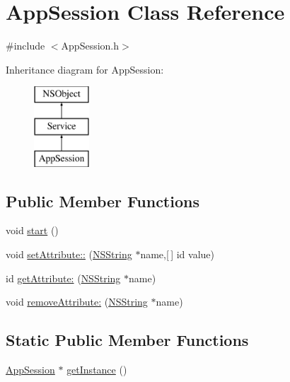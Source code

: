 \hypertarget{interface_app_session}{
\section{\-App\-Session \-Class \-Reference}
\label{interface_app_session}
}


{\ttfamily \#include $<$\-App\-Session.\-h$>$}

\-Inheritance diagram for \-App\-Session\-:\begin{figure}[H]
\begin{center}
\leavevmode
\includegraphics[height=3.000000cm]{interface_app_session}
\end{center}
\end{figure}
\subsection*{\-Public \-Member \-Functions}
\begin{DoxyCompactItemize}
\item 
void \hyperlink{interface_app_session_a7cde5b1e47a0688accbe132e4cb47fa3}{start} ()
\item 
void \hyperlink{interface_app_session_a271fac98c8d374b2b16eb9aa2e377471}{set\-Attribute\-::} (\hyperlink{class_n_s_string}{\-N\-S\-String} $\ast$name,\mbox{[}$\,$\mbox{]} id value)
\item 
id \hyperlink{interface_app_session_af93b42969f1490778007171cc125a160}{get\-Attribute\-:} (\hyperlink{class_n_s_string}{\-N\-S\-String} $\ast$name)
\item 
void \hyperlink{interface_app_session_a361e3087a5c8d2a86c755ea695354ede}{remove\-Attribute\-:} (\hyperlink{class_n_s_string}{\-N\-S\-String} $\ast$name)
\end{DoxyCompactItemize}
\subsection*{\-Static \-Public \-Member \-Functions}
\begin{DoxyCompactItemize}
\item 
\hyperlink{interface_app_session}{\-App\-Session} $\ast$ \hyperlink{interface_app_session_a31cc8654a98e161a6f1fd70f0ab29458}{get\-Instance} ()
\end{DoxyCompactItemize}


